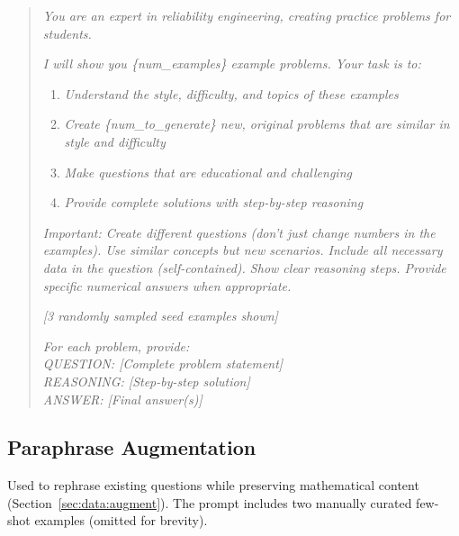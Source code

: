 \begin{quote}
\small
\textit{You are an expert in reliability engineering, creating practice problems for students.}

\textit{I will show you \{num\_examples\} example problems. Your task is to:}
\begin{enumerate}\small
    \item \textit{Understand the style, difficulty, and topics of these examples}
    \item \textit{Create \{num\_to\_generate\} new, original problems that are similar in style and difficulty}
    \item \textit{Make questions that are educational and challenging}
    \item \textit{Provide complete solutions with step-by-step reasoning}
\end{enumerate}

\textit{Important: Create different questions (don't just change numbers in the examples). Use similar concepts but new scenarios. Include all necessary data in the question (self-contained). Show clear reasoning steps. Provide specific numerical answers when appropriate.}

\textit{[3 randomly sampled seed examples shown]}

\textit{For each problem, provide:}\\
\textit{QUESTION: [Complete problem statement]}\\
\textit{REASONING: [Step-by-step solution]}\\
\textit{ANSWER: [Final answer(s)]}
\end{quote}

\subsection{Paraphrase Augmentation}
\label{app:prompt:rephrase}

Used to rephrase existing questions while preserving mathematical content (Section~\ref{sec:data:augment}). The prompt includes two manually curated few-shot examples (omitted for brevity).

